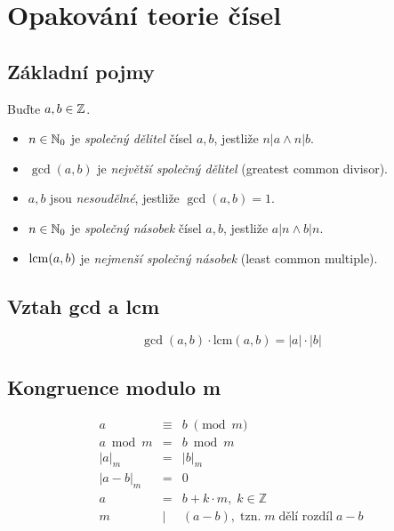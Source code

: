 \section{Opakování teorie čísel}

\subsection{Základní pojmy}

Buďte $a,b \in \mathbb{Z}$.

\begin{itemize}
    \item $n \in \mathbb{N}_0$ je \emph{společný dělitel} čísel $a, b$, jestliže $n|a \wedge n|b$.
    \item $\gcd(a,b)$ je \emph{největší společný dělitel} (greatest common divisor).
    \item $a,b$ jsou \emph{nesoudělné}, jestliže $\gcd(a,b)=1$.
    \item $n \in \mathbb{N}_0$ je \emph{společný násobek} čísel $a, b$, jestliže $a|n \wedge b|n$.
    \item $\operatorname{lcm}(a,b)$ je \emph{nejmenší společný násobek} (least common multiple).
\end{itemize}

\subsection{Vztah gcd a lcm}

\[
    \gcd(a, b) \cdot \text{lcm}(a, b) = |a| \cdot |b|
\]

\subsection{Kongruence modulo m}

\[
    \begin{array}{rcl}
        a         & \equiv & b \; \pmod m                                                \\
        a \bmod m & =      & b \bmod m                                                   \\
        |a|_m     & =      & |b|_m                                                       \\
        |a - b|_m & =      & 0                                                           \\
        a         & =      & b + k \cdot m, \; k \in \mathbb{Z}                          \\
        m         & \mid   & (a - b), \; \text{tzn.} \; m \; \text{dělí rozdíl} \; a - b \\
    \end{array}
\]

